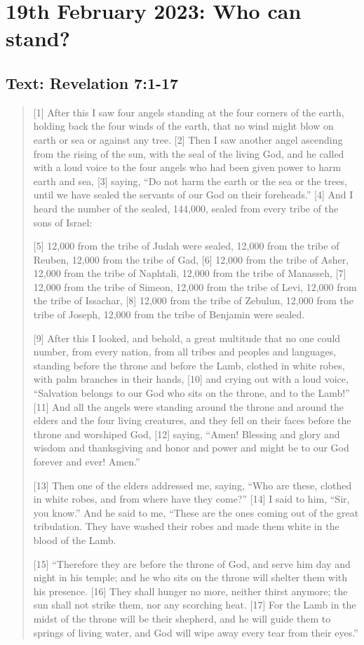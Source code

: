 \section{19th February 2023: Who can stand?}
\subsection*{Text: Revelation 7:1-17}
  \begin{quote}
    [1] After this I saw four angels standing at the four corners of the
    earth, holding back the four winds of the earth, that no wind might blow
    on earth or sea or against any tree.  [2] Then I saw another angel
    ascending from the rising of the sun, with the seal of the living God,
    and he called with a loud voice to the four angels who had been given
    power to harm earth and sea, [3] saying, “Do not harm the earth or the
    sea or the trees, until we have sealed the servants of our God on their
    foreheads.” [4] And I heard the number of the sealed, 144,000, sealed
    from every tribe of the sons of Israel:

    [5] 12,000 from the tribe of Judah were sealed,
    12,000 from the tribe of Reuben,
    12,000 from the tribe of Gad,
    [6] 12,000 from the tribe of Asher,
    12,000 from the tribe of Naphtali,
    12,000 from the tribe of Manasseh,
    [7] 12,000 from the tribe of Simeon,
    12,000 from the tribe of Levi,
    12,000 from the tribe of Issachar,
    [8] 12,000 from the tribe of Zebulun,
    12,000 from the tribe of Joseph,
    12,000 from the tribe of Benjamin were sealed.


    [9] After this I looked, and behold, a great multitude that no one could
    number, from every nation, from all tribes and peoples and languages,
    standing before the throne and before the Lamb, clothed in white robes,
    with palm branches in their hands, [10] and crying out with a loud voice,
    “Salvation belongs to our God who sits on the throne, and to the Lamb!”
    [11] And all the angels were standing around the throne and around the
    elders and the four living creatures, and they fell on their faces before
    the throne and worshiped God, [12] saying, “Amen!  Blessing and glory and
    wisdom and thanksgiving and honor and power and might be to our God
    forever and ever!  Amen.”

    [13] Then one of the elders addressed me, saying, “Who are these, clothed
    in white robes, and from where have they come?” [14] I said to him, “Sir,
    you know.” And he said to me, “These are the ones coming out of the great
    tribulation.  They have washed their robes and made them white in the
    blood of the Lamb.

    [15] “Therefore they are before the throne of God,
        and serve him day and night in his temple;
        and he who sits on the throne will shelter them with his presence.
    [16] They shall hunger no more, neither thirst anymore;
        the sun shall not strike them,
        nor any scorching heat.
    [17] For the Lamb in the midst of the throne will be their shepherd,
        and he will guide them to springs of living water,
    and God will wipe away every tear from their eyes.”
  \end{quote}
